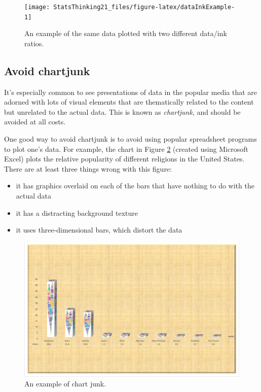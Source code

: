 \documentclass[12pt,]{book}
\providecommand{\tightlist}{%
  \setlength{\itemsep}{0pt}\setlength{\parskip}{0pt}}
\theoremstyle{definition}
\theoremstyle{definition}
\theoremstyle{definition}
\theoremstyle{remark}
\begin{document}
\begin{figure}
\texttt{[image: StatsThinking21\_files/figure-latex/dataInkExample-1]} \caption{An example of the same data plotted with two different data/ink ratios.}\label{fig:dataInkExample}
\end{figure}

\hypertarget{avoid-chartjunk}{%
\subsection{Avoid chartjunk}\label{avoid-chartjunk}}

It's especially common to see presentations of data in the popular media that are adorned with lots of visual elements that are thematically related to the content but unrelated to the actual data. This is known as \emph{chartjunk}, and should be avoided at all costs.

One good way to avoid chartjunk is to avoid using popular spreadsheet programs to plot one's data. For example, the chart in Figure \ref{fig:chartJunk} (created using Microsoft Excel) plots the relative popularity of different religions in the United States. There are at least three things wrong with this figure:

\begin{itemize}
\tightlist
\item
  it has graphics overlaid on each of the bars that have nothing to do with the actual data
\item
  it has a distracting background texture
\item
  it uses three-dimensional bars, which distort the data
\end{itemize}

\begin{figure}
\includegraphics[width=0.8\linewidth,height=0.5\textheight]{images/excel_chartjunk} \caption{An example of chart junk.}\label{fig:chartJunk}
\end{figure}
\end{document}
